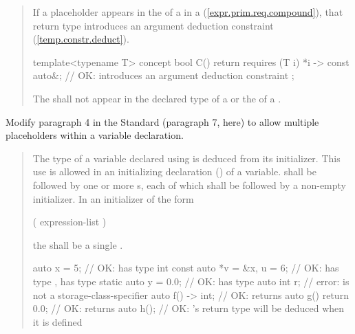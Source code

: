 \begin{quote}
\begin{addedblock}
\pnum
If a placeholder appears in the 
of a  in a  
(\ref{expr.prim.req.compound}), that return type introduces an argument 
deduction constraint (\ref{temp.constr.deduct}).
% 
\enterexample
\begin{codeblock}
template<typename T> concept bool C() {
  return requires (T i) { 
    {*i} -> const auto&; // OK: introduces an argument deduction constraint
  };
}
\end{codeblock}
\exitexample

\pnum
The   shall not appear
in the declared type of a  or the
 of a .
\end{addedblock}
\end{quote}


Modify paragraph 4 in the \Cpp Standard (paragraph 7, here) to allow multiple 
placeholders within a variable declaration.

\begin{quote}
\pnum
The type of a variable declared using 
is deduced from its initializer.
% 
This use is allowed in an initializing declaration () of a variable.
%
%
   shall be followed by one or more s,
each of which shall be followed by a non-empty initializer.
%
In an initializer of the form
\begin{codeblock}
( expression-list )
\end{codeblock}
the  shall be a single 
.
% 
\enterexample
\begin{codeblock}
auto x = 5;                // OK:  has type int
const auto *v = &x, u = 6; // OK:  has type ,  has type 
static auto y = 0.0;       // OK:  has type 
auto int r;                // error:  is not a storage-class-specifier
auto f() -> int;           // OK:  returns 
auto g() { return 0.0; }   // OK:  returns 
auto h();                  // OK: 's return type will be deduced when it is defined
\end{codeblock}
\exitexample
\end{quote}

